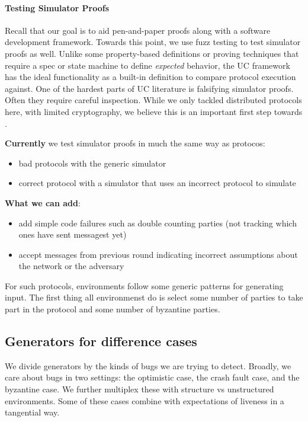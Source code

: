 \paragraph{Testing Simulator Proofs}
Recall that our goal is to aid pen-and-paper proofs along with a software development framework.
Towards this point, we use fuzz testing to test simulator proofs as well.
Unlike some property-based definitions or proving techniques that require a spec or state machine to define \emph{expected} behavior, the UC framework has the ideal functionality as a built-in definition to compare protocol execution against. 
One of the hardest parts of UC literature is falsifying simulator proofs. Often they require careful inspection.
While we only tackled distributed protocols here, with limited cryptography, we believe this is an important first step towards .

\textbf{Currently} we test simulator proofs in much the same way as protocos:
\begin{itemize}
	\item bad protocols with the generic simulator
	\item correct protocol with a simulator that uses an incorrect protocol to simulate
\end{itemize}

\textbf{What we can add}:
\begin{itemize}
	\item add simple code failures such as double counting parties (not tracking which ones have sent messagest yet)
	\item accept messages from previous round indicating incorrect assumptions about the network or the adversary
\end{itemize}

For such protocols, environments follow some generic patterns for generating input.
The first thing all environmenst do is select some number of parties to take part in the protocol and some number of byzantine parties. 

\subsection{Generators for difference cases}
We divide generators by the kinds of bugs we are trying to detect.
Broadly, we care about bugs in two settings: the optimistic case, the crash fault case, and the byzantine case.
We further multiplex these with structure vs unstructured environments. 
Some of these cases combine with expectations of liveness in a tangential way.
